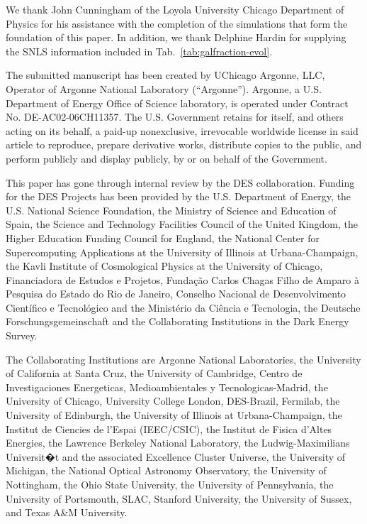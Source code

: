 \documentclass[preprint2]{aastex}    %
\begin{document}
\acknowledgments

We thank John Cunningham of the Loyola University Chicago Department of Physics for his assistance with the completion of the simulations that form the foundation of this paper. In addition, we thank Delphine Hardin for supplying the SNLS information included in Tab.~\ref{tab:galfraction-evol}.

The submitted manuscript has been created by UChicago Argonne, LLC, 
Operator of Argonne National Laboratory (``Argonne''). Argonne, a 
U.S. Department of Energy Office of Science laboratory, is operated under 
Contract No. DE-AC02-06CH11357. The U.S. Government retains for itself, 
and others acting on its behalf, a paid-up nonexclusive, irrevocable 
worldwide license in said article to reproduce, prepare derivative 
works, distribute copies to the public, and perform publicly and 
display publicly, by or on behalf of the Government.

This paper has gone through internal review by the DES collaboration. 
Funding for the DES Projects has been provided by the U.S. Department of Energy, the U.S. National Science Foundation, the Ministry of Science and Education of Spain, the Science and Technology Facilities Council of the United Kingdom, the Higher Education Funding Council for England, the National Center for Supercomputing Applications at the University of Illinois at Urbana-Champaign, the Kavli Institute of Cosmological Physics at the University of Chicago, 
Financiadora de Estudos e Projetos, Funda\c{c}\~{a}o Carlos Chagas Filho de Amparo \`{a} Pesquisa do Estado do Rio de Janeiro, Conselho Nacional de Desenvolvimento Cient\'{i}fico e Tecnol\'{o}gico and the Minist\'{e}rio da Ci\^{e}ncia e Tecnologia, the Deutsche Forschungsgemeinschaft and the Collaborating Institutions in the Dark Energy Survey.

The Collaborating Institutions are Argonne National Laboratories, the University of California at Santa Cruz, the University of Cambridge, Centro de Investigaciones Energeticas, Medioambientales y Tecnologicas-Madrid, the University of Chicago, University College London, DES-Brazil, Fermilab, the University of Edinburgh, the University of Illinois at Urbana-Champaign, the Institut de Ciencies de l'Espai (IEEC/CSIC), the Institut de Fisica d'Altes Energies, the Lawrence Berkeley National Laboratory, the Ludwig-Maximilians Universit�t and the associated Excellence Cluster Universe, the University of Michigan, the National Optical Astronomy Observatory, the University of Nottingham, the Ohio State University, the University of Pennsylvania, the University of Portsmouth, SLAC, Stanford University, the University of Sussex, and Texas A\&M University.
\end{document}
